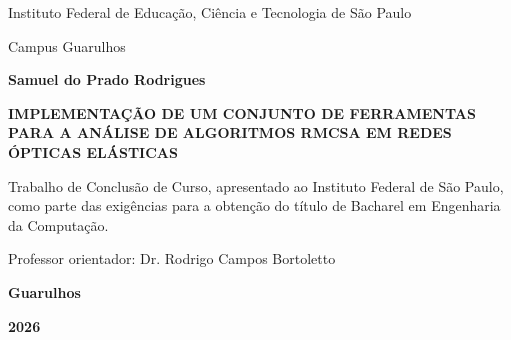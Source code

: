 \begin{center}

Instituto Federal de Educação, Ciência e Tecnologia de São Paulo
			
Campus Guarulhos
			
\vspace{1cm}
			
\textbf{Samuel do Prado Rodrigues}
			
\vspace*{\fill}	
			
\textbf{\MakeUppercase{Implementação de um conjunto de ferramentas para a análise de algoritmos RMCSA em redes ópticas elásticas}}

\vspace*{\fill}

\small

\hspace{\fill}
\begin{minipage}{.4 \linewidth}
Trabalho de Conclusão de Curso, apresentado ao Instituto Federal de São Paulo, como parte das exigências para a obtenção do título de Bacharel em Engenharia da Computação.				

\vspace{.5cm}

Professor orientador: Dr. Rodrigo Campos Bortoletto
\end{minipage}

\vfill

\normalsize

\textbf{Guarulhos}
			
\textbf{2026}
	
\end{center}
